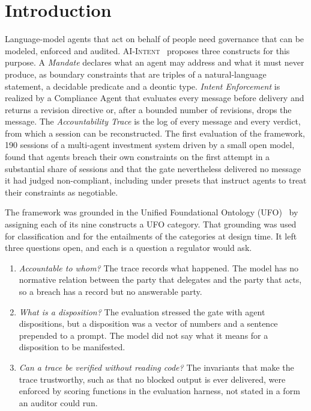 \documentclass[runningheads]{llncs}
\begin{document}
\section{Introduction}
\label{sec:intro}
Language-model agents that act on behalf of people need governance that can be modeled, enforced and audited. \textsc{AI-Intent}~\cite{maass2026aiintent} proposes three constructs for this purpose. A \emph{Mandate} declares what an agent may address and what it must never produce, as boundary constraints that are triples of a natural-language statement, a decidable predicate and a deontic type. \emph{Intent Enforcement} is realized by a Compliance Agent that evaluates every message before delivery and returns a revision directive or, after a bounded number of revisions, drops the message. The \emph{Accountability Trace} is the log of every message and every verdict, from which a session can be reconstructed. The first evaluation of the framework, 190 sessions of a multi-agent investment system driven by a small open model, found that agents breach their own constraints on the first attempt in a substantial share of sessions and that the gate nevertheless delivered no message it had judged non-compliant, including under presets that instruct agents to treat their constraints as negotiable.

The framework was grounded in the Unified Foundational Ontology (UFO)~\cite{guizzardi2005ontological} by assigning each of its nine constructs a UFO category. That grounding was used for classification and for the entailments of the categories at design time. It left three questions open, and each is a question a regulator would ask.

\begin{enumerate}
  \item \emph{Accountable to whom?} The trace records what happened. The model has no normative relation between the party that delegates and the party that acts, so a breach has a record but no answerable party.
  \item \emph{What is a disposition?} The evaluation stressed the gate with agent dispositions, but a disposition was a vector of numbers and a sentence prepended to a prompt. The model did not say what it means for a disposition to be manifested.
  \item \emph{Can a trace be verified without reading code?} The invariants that make the trace trustworthy, such as that no blocked output is ever delivered, were enforced by scoring functions in the evaluation harness, not stated in a form an auditor could run.
\end{enumerate}
\end{document}
